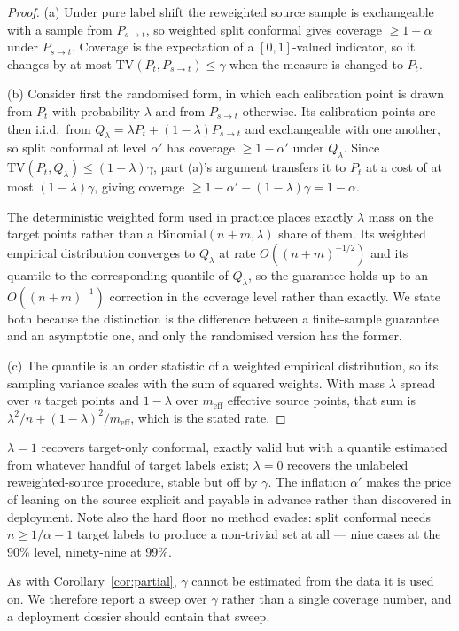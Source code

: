 \begin{proof}
(a) Under pure label shift the reweighted source sample is exchangeable with a
sample from $P_{s\to t}$, so weighted split conformal
\citep{tibshirani2019conformal} gives coverage $\ge1-\alpha$ under
$P_{s\to t}$.  Coverage is the expectation of a $[0,1]$-valued indicator, so it
changes by at most $\mathrm{TV}(P_t,P_{s\to t})\le\gamma$ when the measure is
changed to $P_t$.

(b) Consider first the randomised form, in which each calibration point is drawn
from $P_t$ with probability $\lambda$ and from $P_{s\to t}$ otherwise.  Its
calibration points are then i.i.d.\ from
$Q_\lambda=\lambda P_t+(1-\lambda)P_{s\to t}$ and exchangeable with one another,
so split conformal at level $\alpha'$ has coverage $\ge 1-\alpha'$ under
$Q_\lambda$.  Since $\mathrm{TV}(P_t,Q_\lambda)\le(1-\lambda)\gamma$, part (a)'s
argument transfers it to $P_t$ at a cost of at most $(1-\lambda)\gamma$, giving
coverage $\ge 1-\alpha'-(1-\lambda)\gamma=1-\alpha$.

The deterministic weighted form used in practice places exactly $\lambda$ mass
on the target points rather than a $\mathrm{Binomial}(n+m,\lambda)$ share of
them.  Its weighted empirical distribution converges to $Q_\lambda$ at rate
$O((n+m)^{-1/2})$ and its quantile to the corresponding quantile of $Q_\lambda$,
so the guarantee holds up to an $O((n+m)^{-1})$ correction in the coverage level
rather than exactly.  We state both because the distinction is the difference
between a finite-sample guarantee and an asymptotic one, and only the randomised
version has the former.

(c) The quantile is an order statistic of a weighted empirical distribution, so
its sampling variance scales with the sum of squared weights.  With mass
$\lambda$ spread over $n$ target points and $1-\lambda$ over $m_{\mathrm{eff}}$
effective source points, that sum is
$\lambda^{2}/n+(1-\lambda)^{2}/m_{\mathrm{eff}}$, which is the stated rate.
\end{proof}

\begin{remark}
$\lambda=1$ recovers target-only conformal, exactly valid but with a quantile
estimated from whatever handful of target labels exist; $\lambda=0$ recovers
the unlabeled reweighted-source procedure, stable but off by $\gamma$.  The
inflation $\alpha'$ makes the price of leaning on the source explicit and
payable in advance rather than discovered in deployment.  Note also the hard
floor no method evades: split conformal needs $n\ge1/\alpha-1$ target labels to
produce a non-trivial set at all --- nine cases at the 90\% level, ninety-nine
at 99\%.
\end{remark}

\begin{remark}
As with Corollary~\ref{cor:partial}, $\gamma$ cannot be estimated from the data
it is used on.  We therefore report a sweep over $\gamma$ rather than a single
coverage number, and a deployment dossier should contain that sweep.
\end{remark}
